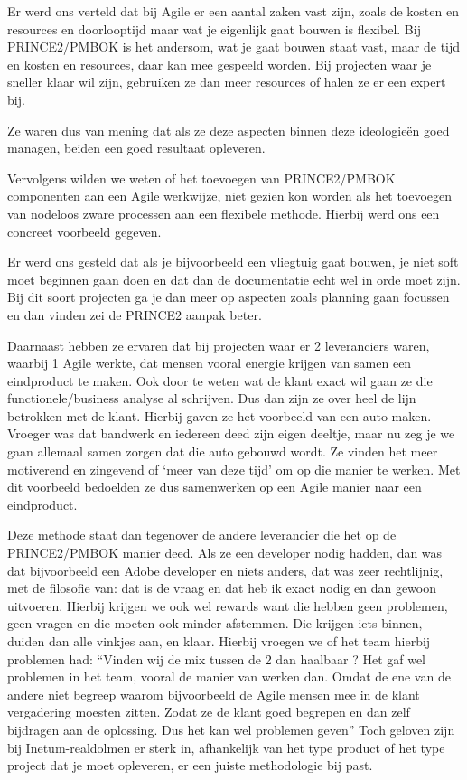 \documentclass[dutch]{hogent-article}
\begin{document}
Er werd ons verteld dat bij Agile er een aantal zaken vast zijn, zoals de kosten en resources en doorlooptijd maar wat je eigenlijk gaat bouwen is flexibel. Bij PRINCE2/PMBOK is het andersom, wat je gaat bouwen staat vast, maar de tijd en kosten en resources, daar kan mee gespeeld worden. Bij projecten waar je sneller klaar wil zijn, gebruiken ze dan meer resources of halen ze er een expert bij.
\newline

Ze waren dus van mening dat als ze deze aspecten binnen deze ideologieën goed managen, beiden een goed resultaat opleveren. 
\newline

Vervolgens wilden we weten of het toevoegen van PRINCE2/PMBOK componenten aan een Agile werkwijze, niet gezien kon worden als het toevoegen van nodeloos zware processen aan een flexibele methode.  Hierbij werd ons een concreet voorbeeld gegeven. 
\newline

Er werd ons gesteld dat als je bijvoorbeeld een vliegtuig gaat bouwen, je niet soft moet beginnen gaan doen en dat dan de documentatie echt wel in orde moet zijn. Bij dit soort projecten ga je dan meer op aspecten zoals planning gaan focussen en dan vinden zei de PRINCE2 aanpak beter. 
\newline

Daarnaast hebben ze ervaren dat bij projecten waar er 2 leveranciers waren, waarbij 1 Agile werkte, dat mensen vooral energie krijgen van samen een eindproduct te maken. Ook door te weten wat de klant exact wil gaan ze die functionele/business analyse al schrijven. Dus dan zijn ze over heel de lijn betrokken met de klant. Hierbij gaven ze het voorbeeld van een auto maken. Vroeger was dat bandwerk en iedereen deed zijn eigen deeltje, maar nu zeg je we gaan allemaal samen zorgen dat die auto gebouwd wordt. Ze vinden het meer motiverend en zingevend of ‘meer van deze tijd’ om op die manier te werken. Met dit voorbeeld bedoelden ze dus samenwerken op een Agile manier naar een eindproduct. 
\newline

Deze methode staat dan tegenover de andere leverancier die het op de PRINCE2/PMBOK manier deed. Als ze een developer nodig hadden, dan was dat bijvoorbeeld een Adobe developer en niets anders, dat was zeer rechtlijnig, met de filosofie van: dat is de vraag en dat heb ik exact nodig en dan gewoon uitvoeren. Hierbij krijgen we ook wel rewards want die hebben geen problemen, geen vragen en die moeten ook minder afstemmen. Die krijgen iets binnen, duiden dan alle vinkjes aan, en klaar. Hierbij vroegen we of het team hierbij problemen had: “Vinden wij de mix tussen de 2 dan haalbaar ? Het gaf wel problemen in het team, vooral de manier van werken dan. Omdat de ene van de andere niet begreep waarom bijvoorbeeld de Agile mensen mee in de klant vergadering moesten zitten. Zodat ze de klant goed begrepen en dan zelf bijdragen aan de oplossing. Dus het kan wel problemen geven” Toch geloven zijn bij Inetum-realdolmen er sterk in, afhankelijk van het type product of het type project dat je moet opleveren, er een juiste methodologie bij past.
\newline
\end{document}
